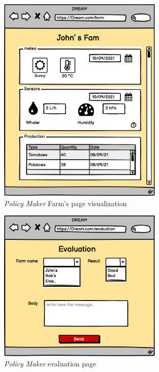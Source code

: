 \begin{figure}[H]
    \begin{center}
    \includegraphics[width=0.7\textwidth]{mocups/PMFarm.png}
    \caption{\emph{Policy Maker} Farm's page visualization}
    \label{fig:PMFarmPage}
    \end{center}
\end{figure}

\begin{figure}[H]
    \begin{center}
    \includegraphics[width=0.7\textwidth]{mocups/Evaluation.png}
    \caption{\emph{Policy Maker} evaluation page}
    \label{fig:PMevaluation}
    \end{center}
\end{figure}

